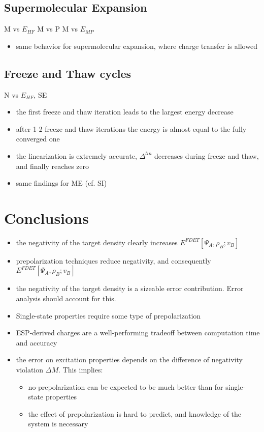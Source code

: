 \documentclass[journal=jctcce,manuscript=article, layout=twocolumn]{achemso}
\begin{document}
\subsection{Supermolecular Expansion}
M vs $E_{HF}$
M vs P
M vs $E_{MP}$
\begin{itemize}
 \item same behavior for supermolecular expansion, where charge transfer is allowed
\end{itemize}

\subsection{Freeze and Thaw cycles}
N vs $E_{HF}$, SE
\begin{itemize}
 \item the first freeze and thaw iteration leads to the largest energy decrease
 \item after 1-2 freeze and thaw iterations the energy is almost equal to the fully converged one
 \item the linearization is extremely accurate, $\Delta^{lin}$ decreases during freeze and thaw, and finally reaches zero
 \item same findings for ME (cf. SI)
\end{itemize}

\section{Conclusions}
\begin{itemize}
 \item the negativity of the target density clearly increases $E^{FDET}[\Psi_A,\rho_B; v_B]$
 \item prepolarization techniques reduce negativity, and consequently $E^{FDET}[\Psi_A,\rho_B; v_B]$
 \item the negativity of the target density is a sizeable error contribution. Error analysis should account for this.
 \item Single-state properties require some type of prepolarization
 \item ESP-derived charges are a well-performing tradeoff between computation time and accuracy
 \item the error on excitation properties depends on the difference of negativity violation $\Delta M$. This implies:
    \begin{itemize}
     \item no-prepolarization can be expected to be much better than for single-state properties
     \item the effect of prepolarization is hard to predict, and knowledge of the system is necessary
    \end{itemize}

\end{itemize}
\end{document}
